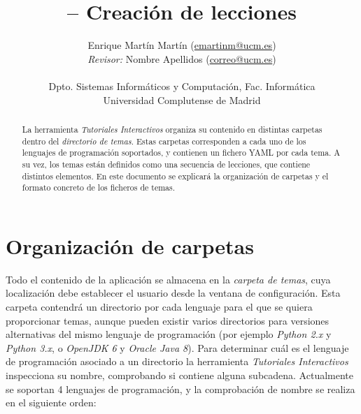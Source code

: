 \documentclass[]{article}
\title{\toolname{} -- Creación de lecciones}
\author{Enrique Martín Martín (\url{emartinm@ucm.es}) \\ \emph{Revisor:} Nombre Apellidos (\url{correo@ucm.es})\\~\\[-.4cm]
	\normalsize{Dpto. Sistemas Informáticos y Computación, Fac. Informática}\\[-0.1cm]
    \normalsize{Universidad Complutense de Madrid}}
\newcommand{\toolname}{\emph{Tutoriales Interactivos}}
\begin{document}
\maketitle

\begin{abstract}
La herramienta \toolname{} organiza su contenido en distintas carpetas dentro del \emph{directorio de temas}. Estas carpetas corresponden a cada uno de los lenguajes de programación soportados, y contienen un fichero YAML por cada tema. A su vez, los temas están definidos como una secuencia de lecciones, que contiene distintos elementos. En este documento se explicará la organización de carpetas y el formato concreto de los ficheros de temas.
\end{abstract}

\tableofcontents

\clearpage


\section{Organización de carpetas}
Todo el contenido de la aplicación se almacena en la \emph{carpeta de temas}, cuya localización debe establecer el usuario desde la ventana de configuración. Esta carpeta contendrá un directorio por cada lenguaje para el que se quiera proporcionar temas, aunque pueden existir varios directorios para versiones alternativas del mismo lenguaje de programación (por ejemplo \emph{Python 2.x} y \emph{Python 3.x}, o \emph{OpenJDK 6} y \emph{Oracle Java 8}). Para determinar cuál es el lenguaje de programación asociado a un directorio la herramienta \toolname{} inspecciona su nombre, comprobando si contiene alguna subcadena. Actualmente se soportan 4 lenguajes de programación, y la comprobación de nombre se realiza en el siguiente orden:
\end{document}
